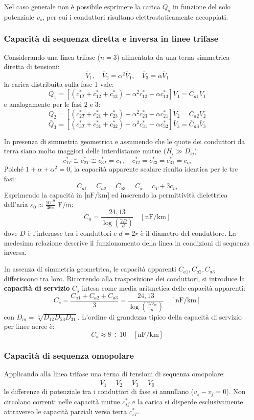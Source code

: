 Nel caso generale non è possibile esprimere la carica $Q_s$ in funzione del solo potenziale $v_s$, per cui i conduttori risultano elettrostaticamente accoppiati.

\subsubsection{Capacità di sequenza diretta e inversa in linee trifase}
Considerando una linea trifase ($n=3$) alimentata da una terna simmetrica diretta di tensioni:
\[\bar{V}_1, \quad \bar{V}_2 = \alpha^2 \bar{V}_1, \quad \bar{V}_3 = \alpha \bar{V}_1\]
la carica distribuita sulla fase 1 vale:
\[\bar{Q}_1 = \left[(c_{1T}^* + c_{12}^* + c_{13}^*) - \alpha^2 c_{12}^* - \alpha c_{13}^*\right] \bar{V}_1 = \bar{C}_{a1} \bar{V}_1\]
e analogamente per le fasi 2 e 3:
\[\bar{Q}_2 = \left[(c_{2T}^* + c_{21}^* + c_{23}^*) - \alpha^2 c_{23}^* - \alpha c_{21}^*\right] \bar{V}_2 = \bar{C}_{a2} \bar{V}_2\]
\[\bar{Q}_3 = \left[(c_{3T}^* + c_{31}^* + c_{32}^*) - \alpha^2 c_{31}^* - \alpha c_{32}^*\right] \bar{V}_3 = \bar{C}_{a3} \bar{V}_3\]

In presenza di simmetria geometrica e assumendo che le quote dei conduttori da terra siano molto maggiori delle interdistanze mutue ($H_i \gg D_{ij}$):
\[c_{1T}^* \cong c_{2T}^* \cong c_{3T}^* = c_T, \quad c_{12}^* = c_{23}^* = c_{31}^* = c_m\]
Poiché $1 + \alpha + \alpha^2 = 0$, la capacità apparente scalare risulta identica per le tre fasi:
\[C_{a1} = C_{a2} = C_{a3} = C_a = c_T + 3 c_m\]
Esprimendo la capacità in [$\text{nF/km}$] ed inserendo la permittività dielettrica dell'aria $\varepsilon_0 \approx \frac{10^{-9}}{36\pi}\text{ F/m}$:
\[C_a = \frac{24{,}13}{\log\left(\frac{2D}{d}\right)} \quad [\text{nF/km}]\]
dove $D$ è l'interasse tra i conduttori e $d = 2r$ è il diametro del conduttore. La medesima relazione descrive il funzionamento della linea in condizioni di sequenza inversa.

In assenza di simmetria geometrica, le capacità apparenti $C_{a1}, C_{a2}, C_{a3}$ differiscono tra loro. Ricorrendo alla trasposizione dei conduttori, si introduce la \textbf{capacità di servizio} $C_s$ intesa come media aritmetica delle capacità apparenti:
\[C_s = \frac{C_{a1} + C_{a2} + C_{a3}}{3} = \frac{24{,}13}{\log\left(\frac{2D_m}{d}\right)} \quad [\text{nF/km}]\]
con $D_m = \sqrt[3]{D_{12} D_{23} D_{31}}$. L'ordine di grandezza tipico della capacità di servizio per linee aeree è:
\[C_s \approx 8 \div 10 \quad [\text{nF/km}]\]

\subsubsection{Capacità di sequenza omopolare}
Applicando alla linea trifase una terna di tensioni di sequenza omopolare:
\[\bar{V}_1 = \bar{V}_2 = \bar{V}_3 = \bar{V}_0\]
le differenze di potenziale tra i conduttori di fase si annullano ($v_s - v_j = 0$). Non circolano correnti nelle capacità mutue $c_{sj}^*$ e la carica si disperde esclusivamente attraverso le capacità parziali verso terra $c_{sT}^*$.

